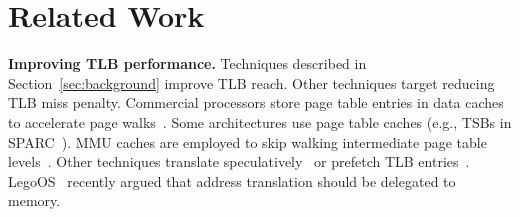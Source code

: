 \section{Related Work}
\label{sec:relatedwork}








\noindent\textbf{Improving TLB performance.} Techniques described in Section~\ref{sec:background} improve TLB reach. Other techniques target reducing TLB miss penalty. Commercial processors store page table entries in data caches to accelerate page walks~\cite{intel:architectures}. Some architectures use page table caches (e.g., TSBs in SPARC~\cite{sun:ultrasparc}). MMU caches are employed to skip walking intermediate page table levels~\cite{bhattacharjee:large-reach, barr:translation}. Other techniques translate speculatively~\cite{barr:spectlb} or prefetch TLB entries~\cite{bhattacharjee:characterizing}. LegoOS~\cite{shan:legoos} recently argued that address translation should be delegated to memory.


